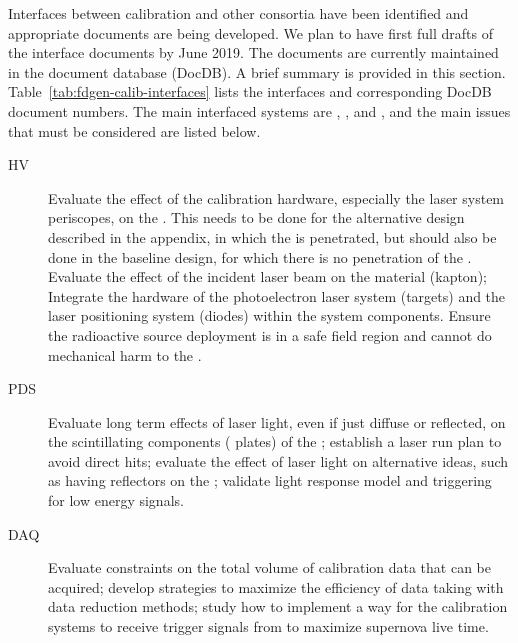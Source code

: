 
Interfaces between calibration and other consortia have been identified and appropriate documents are being developed. We plan to have first full drafts of the interface documents by June 2019. The documents are currently maintained in the  document database (DocDB). %
A brief summary is provided in this section. Table~\ref{tab:fdgen-calib-interfaces} lists the 
interfaces and corresponding DocDB document numbers. 
The main interfaced systems are , , and , and the main issues that must be considered are listed below.

\begin{description}
    \item[HV] Evaluate the effect of the calibration hardware, especially the laser system periscopes, on the \efield. This needs to be done for the alternative design described in the appendix, in which the  is penetrated, but should also be done in the baseline design, for which there is no penetration of the . 
    Evaluate the effect of the incident laser beam on the  material (kapton); Integrate the hardware of the %
    photoelectron laser system (targets) and the laser positioning system (diodes) within the  system components. Ensure the radioactive source deployment is in a safe field region and cannot do mechanical harm to the .
    \item[PDS] Evaluate long term effects of laser light, even if just diffuse or reflected, on the scintillating components ( plates) of the ; establish a laser run plan to avoid direct hits; evaluate the effect of laser light on alternative  ideas, such as having reflectors on the ; validate light response model and triggering for low energy signals. 
    \item[DAQ] Evaluate  constraints on the total volume of calibration data that can be acquired; develop strategies to maximize the efficiency of data taking with data reduction methods; study how to implement a way for the calibration systems to receive trigger signals from  to maximize supernova live time.
\end{description}

